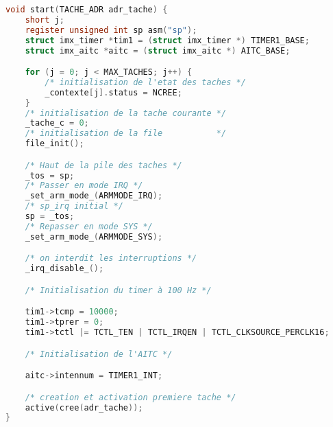 \begin{lstlisting}[language=C, caption=noyau.c]
void start(TACHE_ADR adr_tache) {
    short j;
    register unsigned int sp asm("sp");
    struct imx_timer *tim1 = (struct imx_timer *) TIMER1_BASE;
    struct imx_aitc *aitc = (struct imx_aitc *) AITC_BASE;

    for (j = 0; j < MAX_TACHES; j++) {
        /* initialisation de l'etat des taches */
        _contexte[j].status = NCREE;
    }
    /* initialisation de la tache courante */
    _tache_c = 0;
    /* initialisation de la file           */
    file_init();

    /* Haut de la pile des taches */
    _tos = sp;
    /* Passer en mode IRQ */
    _set_arm_mode_(ARMMODE_IRQ);
    /* sp_irq initial */
    sp = _tos;
    /* Repasser en mode SYS */
    _set_arm_mode_(ARMMODE_SYS);

    /* on interdit les interruptions */
    _irq_disable_();

    /* Initialisation du timer à 100 Hz */

    tim1->tcmp = 10000;
    tim1->tprer = 0;
    tim1->tctl |= TCTL_TEN | TCTL_IRQEN | TCTL_CLKSOURCE_PERCLK16;

    /* Initialisation de l'AITC */

    aitc->intennum = TIMER1_INT;

    /* creation et activation premiere tache */
    active(cree(adr_tache));
}
\end{lstlisting}

